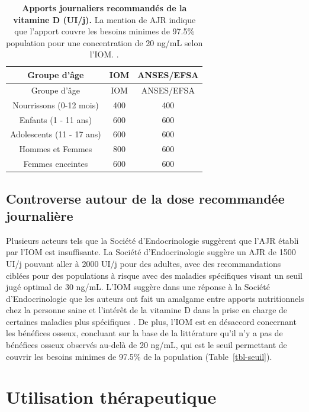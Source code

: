 \documentclass[
  a4paper,
  DIV=11,
  numbers=noendperiod,
  listof=totoc]{scrreprt}
\begin{document}
\hypertarget{tbl-AJR}{}
\begin{longtable}[]{@{}ccc@{}}
\caption{\label{tbl-AJR}\textbf{Apports journaliers recommandés de la
vitamine D (UI/j).} La mention de \ac{AJR} indique que l'apport couvre
les besoins minimes de 97.5\% population pour une concentration de 20
ng/mL selon l'\ac{IOM}. \autocite{ANSES.2021,IOM.2011}.}\tabularnewline
\toprule\noalign{}
Groupe d'âge & IOM & ANSES/EFSA \\
\midrule\noalign{}
\endfirsthead
\toprule\noalign{}
Groupe d'âge & IOM & ANSES/EFSA \\
\midrule\noalign{}
\endhead
\bottomrule\noalign{}
\endlastfoot
Nourrissons (0-12 mois) & 400 & 400 \\
Enfants (1 - 11 ans) & 600 & 600 \\
Adolescents (11 - 17 ans) & 600 & 600 \\
Hommes et Femmes & 800 & 600 \\
Femmes enceintes & 600 & 600 \\
\end{longtable}

\hypertarget{controverse-autour-de-la-dose-recommanduxe9e-journaliuxe8re}{%
\subsection{Controverse autour de la dose recommandée
journalière}\label{controverse-autour-de-la-dose-recommanduxe9e-journaliuxe8re}}

Plusieurs acteurs tels que la Société d'Endocrinologie suggèrent que
l'\ac{AJR} établi par l'\ac{IOM} est insuffisante. La Société
d'Endocrinologie suggère un \ac{AJR} de 1500 UI/j pouvant aller à 2000
UI/j pour des adultes, avec des recommandations ciblées pour des
populations à risque avec des maladies spécifiques visant un seuil jugé
optimal de 30 ng/mL. L'\ac{IOM} suggère dans une réponse à la Société
d'Endocrinologie que les auteurs ont fait un amalgame entre apports
nutritionnels chez la personne saine et l'intérêt de la vitamine D dans
la prise en charge de certaines maladies plus spécifiques
\autocite{Rosen.2012}. De plus, l'\ac{IOM} est en désaccord concernant
les bénéfices osseux, concluant sur la base de la littérature qu'il n'y
a pas de bénéfices osseux observés au-delà de 20 ng/mL, qui est le seuil
permettant de couvrir les besoins minimes de 97.5\% de la population
(Table~\ref{tbl-seuil}).

\hypertarget{utilisation-thuxe9rapeutique}{%
\section{Utilisation thérapeutique}\label{utilisation-thuxe9rapeutique}}
\end{document}
